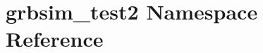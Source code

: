 \hypertarget{namespacegrbsim__test2}{\section{grbsim\-\_\-test2 Namespace Reference}
\label{namespacegrbsim__test2}
}
